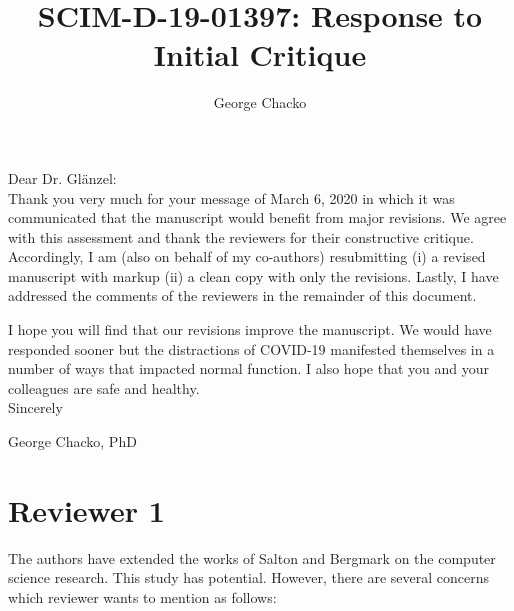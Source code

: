 \documentclass[11pt, oneside]{article}   	%
\title{SCIM-D-19-01397: Response to Initial Critique}
\author{George Chacko}
\begin{document}
\maketitle

\vspace{30 mm}
\noindent Dear Dr. Gl{\"a}nzel:\\

Thank you very much for your message of March 6, 2020 in which it was communicated that the manuscript would benefit from major revisions.  We agree with this assessment and thank the reviewers for their constructive critique. Accordingly, I am (also on behalf of my co-authors) resubmitting (i) a revised manuscript with markup (ii) a clean copy with only the revisions. Lastly, I have addressed the comments of the reviewers in the remainder of this document. 

I hope you will find that our revisions improve the manuscript. We would have responded sooner but the distractions of COVID-19 manifested themselves in a number of ways that impacted normal function. I also hope that you and your colleagues are safe and healthy.\\


\noindent Sincerely

\vspace{8 mm}

\noindent George Chacko, PhD

\newpage

\section*{Reviewer 1} The authors have extended the works of Salton and Bergmark on the computer science research. This study has potential. However, there are several concerns which reviewer wants to mention as follows:
\end{document}
